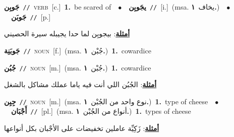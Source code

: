 \documentclass[10pt,a4paper,twoside]{article} %
\begin{document}
\begin{multicols}{2}
{{{{\setlength\topsep{0pt}\textbf{\foreignlanguage{arabic}{جَوبِن}}\ {\color{gray}\texttt{//}\color{black}}\ \textsc{verb}\ [c.]\ \textbf{1.}~be scared of\ \ $\bullet$\ \ \setlength\topsep{0pt}\textbf{\foreignlanguage{arabic}{يجَوبِن}}\ {\color{gray}\texttt{//}\color{black}}\ [i.]\ \color{gray}(msa. \foreignlanguage{arabic}{يخاف}~\foreignlanguage{arabic}{\textbf{١.}})\color{black}\ \ $\bullet$\ \ \setlength\topsep{0pt}\textbf{\foreignlanguage{arabic}{جَوبَن}}\ {\color{gray}\texttt{//}\color{black}}\ [p.]\  \begin{flushright}\color{gray}\foreignlanguage{arabic}{\textbf{\underline{\foreignlanguage{arabic}{أمثلة}}}: بيجوبِن لما حدا يجيبله سيرة الحصيني}\end{flushright}\color{black}} \vspace{2mm}

{\setlength\topsep{0pt}\textbf{\foreignlanguage{arabic}{جَوبَنِة}}\ {\color{gray}\texttt{//}\color{black}}\ \textsc{noun}\ [f.]\ \color{gray}(msa. \foreignlanguage{arabic}{جُبْن}~\foreignlanguage{arabic}{\textbf{١.}})\color{black}\ \textbf{1.}~cowardice\ 

{\setlength\topsep{0pt}\textbf{\foreignlanguage{arabic}{جُبُن}}\ {\color{gray}\texttt{//}\color{black}}\ \textsc{noun}\ [m.]\ \color{gray}(msa. \foreignlanguage{arabic}{جُبْن}~\foreignlanguage{arabic}{\textbf{١.}})\color{black}\ \textbf{1.}~cowardice\  \begin{flushright}\color{gray}\foreignlanguage{arabic}{\textbf{\underline{\foreignlanguage{arabic}{أمثلة}}}: الجُبُن اللي أنت فيه ياما عملك مشاكل بالشغل}\end{flushright}\color{black}} \vspace{2mm}

{\setlength\topsep{0pt}\textbf{\foreignlanguage{arabic}{جِبِن}}\ {\color{gray}\texttt{//}\color{black}}\ \textsc{noun}\ [m.]\ \color{gray}(msa. \foreignlanguage{arabic}{نوع واحد من الجُبْن}~\foreignlanguage{arabic}{\textbf{١.}})\color{black}\ \textbf{1.}~type of cheese\ \ $\bullet$\ \ \setlength\topsep{0pt}\textbf{\foreignlanguage{arabic}{أَجْبَان}}\ {\color{gray}\texttt{//}\color{black}}\ [pl.]\ \color{gray}(msa. \foreignlanguage{arabic}{أنواع من الجُبْن}~\foreignlanguage{arabic}{\textbf{١.}})\color{black}\ \textbf{1.}~types of cheese\  \begin{flushright}\color{gray}\foreignlanguage{arabic}{\textbf{\underline{\foreignlanguage{arabic}{أمثلة}}}: زَكِيِّة عاملين تخفيضات على الأجْبان بكل أنواعها}\end{flushright}\color{black}} \vspace{2mm}

}}}}
\end{multicols}
\end{document}

